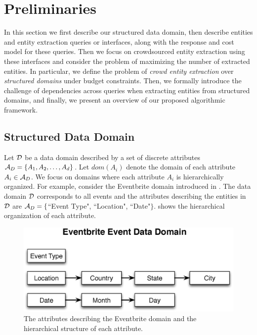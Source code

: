 
\section{Preliminaries}
\label{sec:prelims}
In this section we first describe our structured data domain, then describe entities and entity extraction queries or interfaces, along with the response and cost model for these queries. Then we focus on crowdsourced entity extraction using these interfaces and consider the problem of maximizing the number of extracted entities. In particular, we define the problem of {\em crowd entity extraction} over {\em structured domains} under budget constraints. Then, we formally introduce the challenge of dependencies across queries when extracting entities from structured domains, and finally, we present an overview of our proposed algorithmic framework.


\subsection{Structured Data Domain}
\label{sec:data-domain}

Let $\mathcal{D}$ be a data domain described by a set of discrete attributes $\mathcal{A}_D = \{A_1, A_2, \dots, A_d\}$. Let $dom(A_i)$ denote the domain of each attribute $A_i  \in \mathcal{A}_D$. We focus on domains where each attribute $A_i$ is hierarchically organized. For example, consider the Eventbrite domain introduced in . The data domain $\mathcal{D}$ corresponds to all events and the attributes describing the entities in $\mathcal{D}$ are $\mathcal{A}_D = \{$``Event Type", ``Location", ``Date"$\}$.  shows the hierarchical organization of each attribute.

\begin{figure}[h]
	\begin{center}
	\includegraphics[clip,scale=0.33]{figs/eventsDomain.eps}
	\vspace{-10pt}
	\caption{The attributes describing the Eventbrite domain and the hierarchical structure of each attribute.}
	\label{fig:eventsdomain}
	\end{center}
	\vspace{-20pt}
\end{figure}

